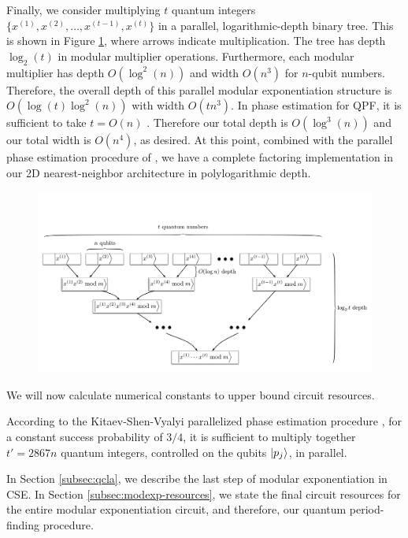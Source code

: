 Finally, we consider multiplying $t$ quantum integers
$\{x^{(1)}, x^{(2)}, \ldots, x^{(t-1)}, x^{(t)}\}$ in a parallel,
logarithmic-depth binary tree.
This is shown in Figure \ref{fig:modexp-qq-parallel}, where arrows indicate multiplication.
The tree has depth $\log_2(t)$ in modular multiplier operations. Furthermore,
each
modular multiplier has depth $O(\log^2(n))$ and width $O(n^3)$ for $n$-qubit
numbers. Therefore, the overall depth of this parallel modular exponentiation
structure is $O(\log(t)\log^2(n))$ with width $O(tn^3)$.
In phase estimation for QPF, it is
sufficient to take $t = O(n)$ \cite{Nielsen2000,Kitaev2002}. Therefore our total depth is
$O(\log^3(n))$ and our total width is $O(n^4)$, as desired. At this point, combined with the parallel phase
estimation procedure of \cite{Kitaev2002}, we have a complete factoring
implementation in our 2D nearest-neighbor architecture in polylogarithmic
depth.
%
\begin{figure}[tb!]
\centerline{
\includegraphics[width=5.5in]{figures/mod-exp-par.pdf}
}
\label{fig:modexp-qq-parallel}
\end{figure}

We will now calculate numerical
constants to upper bound circuit resources.

According to the Kitaev-Shen-Vyalyi parallelized phase estimation procedure
\cite{Kitaev2002},
for a constant success probability of $3/4$,
it is sufficient to multiply together $t' = 2867n$ quantum integers,
controlled on the qubits $\left\vert{p_j}\right\rangle$, in parallel.

In Section \ref{subsec:qcla}, we describe the last step of modular
exponentiation in CSE. In Section \ref{subsec:modexp-resources}, we
state the final circuit resources for the entire modular exponentiation
circuit,
and therefore, our quantum period-finding procedure.

